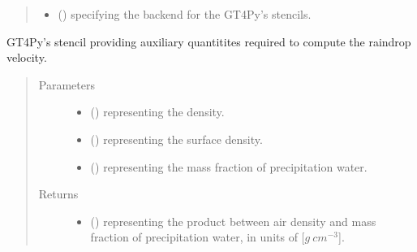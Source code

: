 \documentclass[letterpaper,10pt,english]{sphinxmanual}
\begin{document}
\begin{fulllineitems}
\begin{fulllineitems}
\begin{quote}
\begin{description}
\begin{itemize}
\item {} 
 () \textendash{}  specifying the backend for the GT4Py’s stencils.

\end{itemize}

\end{description}\end{quote}

\end{fulllineitems}


\begin{fulllineitems}
\label{\detokenize{api:parameterizations.adjustment_microphysics.AdjustmentMicrophysics._stencil_raindrop_fall_velocity_defs}}
GT4Py’s stencil providing auxiliary quantitites required to compute the raindrop velocity.
\begin{quote}\begin{description}
\item[{Parameters}] \leavevmode\begin{itemize}
\item {} 
 () \textendash{}  representing the density.

\item {} 
 () \textendash{}  representing the surface density.

\item {} 
 () \textendash{}  representing the mass fraction of precipitation water.

\end{itemize}

\item[{Returns}] \leavevmode
\begin{itemize}
\item {} 
 () \textendash{}  representing the product between air density and mass fraction of precipitation water,
in units of {[}\(g ~ cm^{-3}\){]}.


\end{itemize}
\end{description}
\end{quote}
\end{fulllineitems}
\end{fulllineitems}
\end{document}
